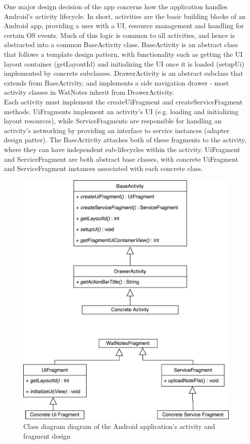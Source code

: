 \documentclass[12pt]{article}
\begin{document}
    One major design decision of the app concerns how the application handles Android's activity lifecycle. In short, activities are the basic building blocks of
    an Android app, providing a user with a UI, resource management and handling for certain OS events. Much of this logic is common to all activities, and
    hence is abstracted into a common BaseActivity class. BaseActivity is an abstract class that follows a template design pattern, with functionality
    such as getting the UI layout container (getLayoutId) and initializing the UI once it is loaded (setupUi) implemented by concrete subclasses. DrawerActivity
    is an abstract subclass that extends from BaseActivity, and implements a side navigation drawer - most activity classes in WatNotes inherit from DrawerActivity. \\

    Each activity must implement the createUiFragment and createServiceFragment methods. UiFragments implement an activity's UI (e.g. loading and
    initializing layout resources), while ServiceFragments are responsible for handling an activity's networking by providing an interface
    to service instances (adapter design patter). The BaseActivity attaches both of these fragments to the activity, where they can have independent sub-lifecycles
    within the activity. UiFragment and ServiceFragment are both abstract base classes, with concrete UiFragment and ServiceFragment instances associated with each
    concrete class. \\

    \begin{figure}[H]
      \includegraphics[width=\textwidth]{assets/android-activity-class.pdf}
      \caption{Class diagram diagram of the Android application's activity and fragment design}
    \end{figure}
\end{document}
